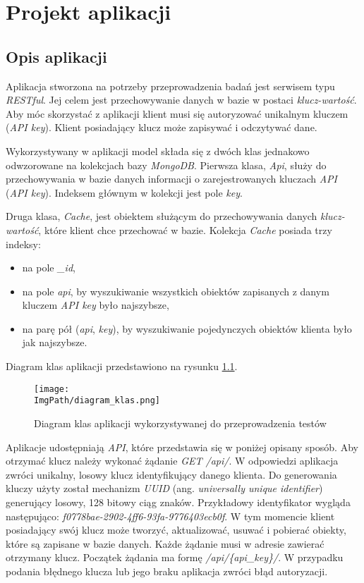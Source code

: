 \chapter{Projekt aplikacji}
\section{Opis aplikacji}
Aplikacja stworzona na potrzeby przeprowadzenia badań jest serwisem typu \textsl{RESTful}. Jej celem jest przechowywanie danych w bazie w postaci \textsl{klucz-wartość}. Aby móc skorzystać z aplikacji klient musi się autoryzować unikalnym kluczem (\textsl{API key}). Klient posiadający klucz może zapisywać i odczytywać dane. 

Wykorzystywany w aplikacji model składa się z dwóch klas jednakowo odwzorowane na kolekcjach bazy \textsl{MongoDB}. Pierwsza klasa, \textsl{Api}, służy do przechowywania w bazie danych informacji o zarejestrowanych kluczach \textsl{API} (\textsl{API key}). Indeksem głównym w kolekcji jest pole \textsl{key}.

Druga klasa, \textsl{Cache}, jest obiektem służącym do przechowywania danych \textsl{klucz-wartość}, które klient chce przechować w bazie.
Kolekcja \textsl{Cache} posiada trzy indeksy:\begin{itemize}
    \item na pole \textsl{\_id},
    \item na pole \textsl{api}, by wyszukiwanie wszystkich obiektów zapisanych z danym kluczem \textsl{API key} było najszybsze,
    \item na parę pół (\textsl{api}, \textsl{key}), by wyszukiwanie pojedynczych obiektów klienta było jak najszybsze.\end{itemize}
Diagram klas aplikacji przedstawiono na  rysunku \ref{fig:class_diagram}. 
\begin{figure}[!ht]
\centering
\texttt{[image: \\ImgPath/diagram\_klas.png]}
\caption{Diagram klas aplikacji wykorzystywanej do przeprowadzenia testów}
\label{fig:class_diagram}
\end{figure}

Aplikacje udostępniają \textsl{API}, które przedstawia się w poniżej opisany sposób. Aby otrzymać klucz należy wykonać żądanie \textsl{GET /api/}. W odpowiedzi aplikacja zwróci unikalny, losowy klucz identyfikujący danego klienta. Do generowania kluczy użyty został mechanizm \textsl{UUID} (ang. \textsl{universally unique identifier}) generujący losowy, 128 bitowy ciąg znaków. Przykładowy identyfikator wygląda następująco: \textsl{f0778bae-2902-4ff6-93fa-9776403ecb0f}. W tym momencie klient posiadający swój klucz może tworzyć, aktualizować, usuwać i pobierać obiekty, które są zapisane w bazie danych. Każde żądanie  musi w adresie zawierać otrzymany klucz. Początek żądania ma formę \textsl{/api/\{api\_key\}/}. W przypadku podania błędnego klucza lub jego braku aplikacja zwróci błąd autoryzacji. 
 

